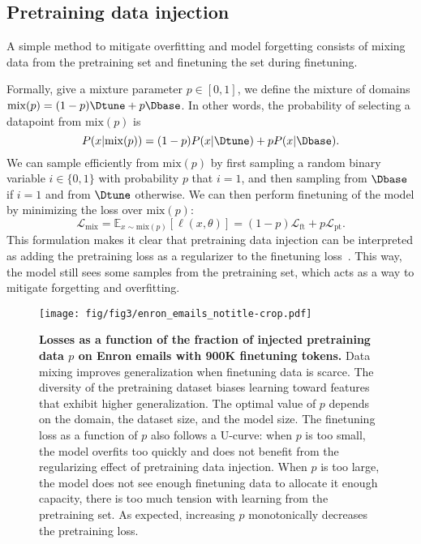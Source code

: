 \subsection{Pretraining data injection}

A simple method to mitigate overfitting and model forgetting consists of mixing data from the pretraining set and finetuning the set during finetuning.

Formally, give a mixture parameter $p \in [0, 1]$, we define the mixture of domains $\mathrm{mix}(p) = (1-p)\Dtune + p \Dbase$. 
In other words, the probability of selecting a datapoint from $\mathrm{mix}(p)$ is
$$
P(x|\mathrm{mix}(p)) = (1- p) P(x|\Dtune) + p P(x|\Dbase).
$$
We can sample efficiently from $\mathrm{mix}(p)$ by first sampling a random binary variable $i\in\{0, 1\}$ with probability $p$ that $i=1$, and then sampling from $\Dbase$ if $i=1$ and from $\Dtune$ otherwise. 
We can then perform finetuning of the model by minimizing the loss over $\mathrm{mix}(p)$: 
$$
\mathcal{L}_{\mathrm{mix}} = \mathbb{E}_{x\sim \mathrm{mix}(p)}[\ell(x, \theta)] = (1-p) \mathcal{L}_{\mathrm{ft}} + p \mathcal{L}_{\mathrm{pt}}.
$$
This formulation makes it clear that pretraining data injection can be interpreted as adding the pretraining loss as a regularizer to the finetuning loss~\citep{hastie2017elements}.
This way, the model still sees some samples from the pretraining set, which acts as a way to mitigate forgetting and overfitting.


\begin{figure*}[t]
    \centering
    \texttt{[image: fig/fig3/enron\_emails\_notitle-crop.pdf]}
    \caption{ \textbf{Losses as a function of the fraction of injected pretraining data $p$ on Enron emails with 900K finetuning tokens.} Data mixing improves generalization when finetuning data is scarce. The diversity of the pretraining dataset biases learning toward features that exhibit higher generalization. The optimal value of $p$ depends on the domain, the dataset size, and the model size. The finetuning loss as a function of $p$ also follows a U-curve: when $p$ is too small, the model overfits too quickly and does not benefit from the regularizing effect of pretraining data injection. When $p$ is too large, the model does not see enough finetuning data to allocate it enough capacity, there is too much tension with learning from the pretraining set.
    As expected, increasing $p$ monotonically decreases the pretraining loss.}
    \label{fig:optimalgamma}
\end{figure*}


